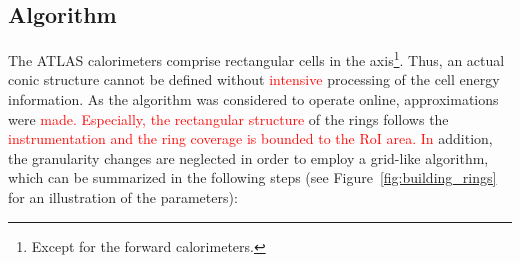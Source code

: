 

\subsection{\fastcalo Algorithm}\label{top:algorithm}

The ATLAS calorimeters comprise rectangular cells in the
\etaphi axis\footnote{Except for the forward calorimeters.}. Thus, an actual conic structure cannot be defined
without \textcolor{red}{intensive} processing of the cell energy information. As the algorithm was
considered to operate online, approximations were  \textcolor{red}{made. Especially, the rectangular structure} of
the rings follows the \textcolor{red}{instrumentation and the ring coverage is bounded to the RoI area. In} addition, the granularity changes are neglected in order to employ a
grid-like algorithm, which can be summarized in the following steps (see
Figure~\ref{fig:building_rings} for an illustration of the parameters):

